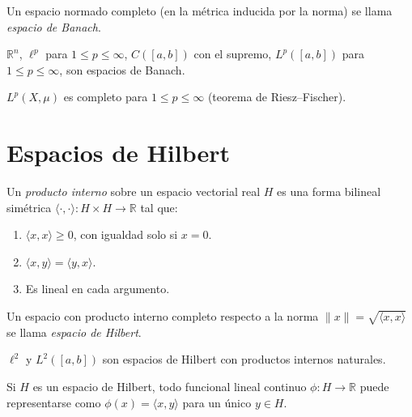 \begin{definition}
\label{def:banach}
Un espacio normado completo (en la métrica inducida por la norma) se llama \emph{espacio de Banach}.
\end{definition}

\begin{example}
\label{ej:banach-clasicos}
$\mathbb{R}^n$, $\ell^p$ para $1\leq p\leq\infty$, $C([a,b])$ con el supremo, $L^p([a,b])$ para $1\leq p\leq\infty$, son espacios de Banach.
\end{example}

\begin{theorem}
\label{teo:completitud-lp}
$L^p(X,\mu)$ es completo para $1\leq p\leq\infty$ (teorema de Riesz--Fischer).
\end{theorem}

\section{Espacios de Hilbert}

\begin{definition}
\label{def:producto-interno}
Un \emph{producto interno} sobre un espacio vectorial real $H$ es una forma bilineal simétrica $\langle\cdot,\cdot\rangle\colon H\times H\to\mathbb{R}$ tal que:
\begin{enumerate}
  \item[(i)] $\langle x,x\rangle\geq 0$, con igualdad solo si $x=0$.
  \item[(ii)] $\langle x,y\rangle=\langle y,x\rangle$.
  \item[(iii)] Es lineal en cada argumento.
\end{enumerate}
\end{definition}

\begin{definition}
\label{def:hilbert}
Un espacio con producto interno completo respecto a la norma $\|x\|=\sqrt{\langle x,x\rangle}$ se llama \emph{espacio de Hilbert}.
\end{definition}

\begin{example}
\label{ej:l2-hilbert}
$\ell^2$ y $L^2([a,b])$ son espacios de Hilbert con productos internos naturales.
\end{example}

\begin{theorem}
\label{teo:riesz}
Si $H$ es un espacio de Hilbert, todo funcional lineal continuo $\phi\colon H\to\mathbb{R}$ puede representarse como $\phi(x)=\langle x,y\rangle$ para un único $y\in H$.
\end{theorem}

